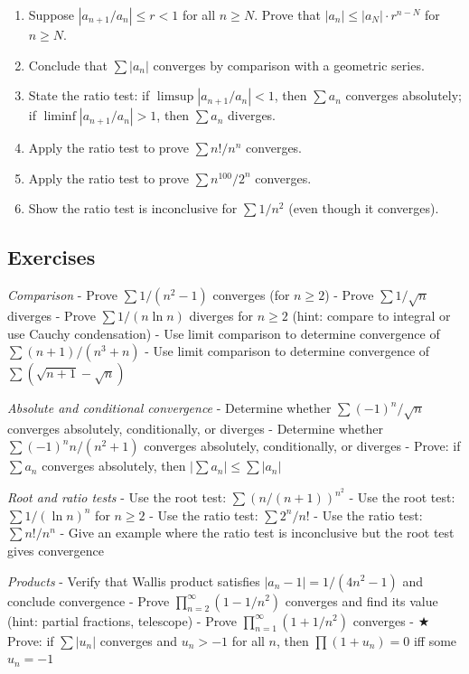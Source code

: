 \documentclass[
  10pt,
  letterpaper,
]{scrbook}
\begin{document}
\begin{enumerate}
\def\labelenumi{(\alph{enumi})}
\item
  Suppose \(|a_{n+1}/a_n| \leq r < 1\) for all \(n \geq N\). Prove that
  \(|a_n| \leq |a_N| \cdot r^{n-N}\) for \(n \geq N\).
\item
  Conclude that \(\sum |a_n|\) converges by comparison with a geometric
  series.
\item
  State the ratio test: if \(\limsup |a_{n+1}/a_n| < 1\), then
  \(\sum a_n\) converges absolutely; if \(\liminf |a_{n+1}/a_n| > 1\),
  then \(\sum a_n\) diverges.
\item
  Apply the ratio test to prove \(\sum n!/n^n\) converges.
\item
  Apply the ratio test to prove \(\sum n^{100}/2^n\) converges.
\item
  Show the ratio test is inconclusive for \(\sum 1/n^2\) (even though it
  converges).
\end{enumerate}

\subsection{Exercises}\label{exercises-16}

\emph{Comparison} - Prove \(\sum 1/(n^2 - 1)\) converges (for
\(n \geq 2\)) - Prove \(\sum 1/\sqrt{n}\) diverges - Prove
\(\sum 1/(n \ln n)\) diverges for \(n \geq 2\) (hint: compare to
integral or use Cauchy condensation) - Use limit comparison to determine
convergence of \(\sum (n+1)/(n^3 + n)\) - Use limit comparison to
determine convergence of \(\sum (\sqrt{n+1} - \sqrt{n})\)

\emph{Absolute and conditional convergence} - Determine whether
\(\sum (-1)^n / \sqrt{n}\) converges absolutely, conditionally, or
diverges - Determine whether \(\sum (-1)^n n / (n^2 + 1)\) converges
absolutely, conditionally, or diverges - Prove: if \(\sum a_n\)
converges absolutely, then \(|\sum a_n| \leq \sum |a_n|\)

\emph{Root and ratio tests} - Use the root test:
\(\sum (n/(n+1))^{n^2}\) - Use the root test: \(\sum 1/(\ln n)^n\) for
\(n \geq 2\) - Use the ratio test: \(\sum 2^n / n!\) - Use the ratio
test: \(\sum n! / n^n\) - Give an example where the ratio test is
inconclusive but the root test gives convergence

\emph{Products} - Verify that Wallis product satisfies
\(|a_n - 1| = 1/(4n^2-1)\) and conclude convergence - Prove
\(\prod_{n=2}^{\infty}(1 - 1/n^2)\) converges and find its value (hint:
partial fractions, telescope) - Prove
\(\prod_{n=1}^{\infty}(1 + 1/n^2)\) converges - ★ Prove: if
\(\sum |u_n|\) converges and \(u_n > -1\) for all \(n\), then
\(\prod(1+u_n) = 0\) iff some \(u_n = -1\)
\end{document}
